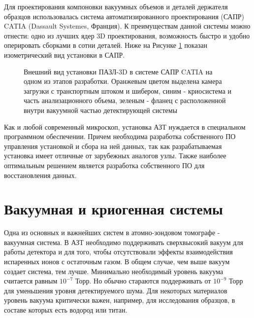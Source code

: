 Для проектирования компоновки вакуумных объемов и деталей держателя образцов использовалась система автоматизированного проектирования (САПР) CATIA (Dassault Systemes, Франция). К преимуществам данной системы можно отнести: одно из лучших ядер 3D проектирования, возможность быстро и удобно оперировать сборками в сотни деталей. Ниже на Рисунке \cref{fig:APPLE_CAD} показан изометрический вид установки в САПР.
\begin{figure}[htb]
	\caption{Внешний вид установки ПАЗЛ-3D в системе САПР CATIA на одном из этапов разработки. Оранжевым цветом выделена камера загрузки с транспортным штоком и шибером, синим - криосистема и часть анализационного объема, зеленым - фланец с расположенной внутри вакуумной частью детектирующей системы}
	\label{fig:APPLE_CAD}
\end{figure}

Как и любой современный микроскоп, установка АЗТ нуждается в специальном программном обеспечении. Причем необходима разработка собственного ПО управления установкой и сбора на ней данных, так как разрабатываемая установка имеет отличные от зарубежных аналогов узлы. Также наиболее оптимальным решением является разработка собственного ПО для восстановления данных.


\FloatBarrier

\section{Вакуумная и криогенная системы}\label{sec:ch2/sec2}

Одна из основных и важнейших систем в атомно-зондовом томографе - вакуумная система. В АЗТ необходимо поддерживать сверхвысокий вакуум для работы детектора и для того, чтобы отсутствовали эффекты взаимодействия испаренных ионов с остаточным газом. В общем случае, чем выше вакуум создает система, тем лучше. Минимально необходимый уровень вакуума считается равным $10^{-7}$ Торр. Но обычно стараются поддерживать от $10^{-9}$ Торр для уменьшения уровня детектируемого шума. Для некоторых материалов уровень вакуума критически важен, например, для исследования образцов, в составе которых есть водород или титан.

